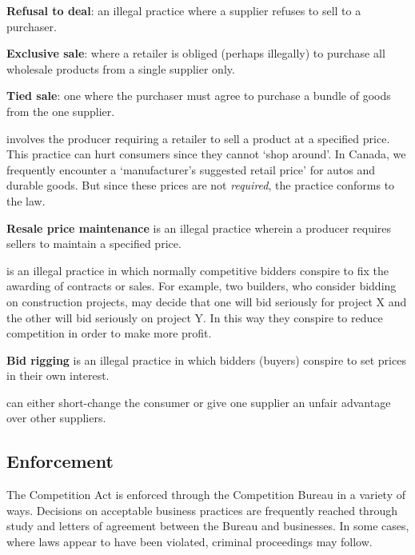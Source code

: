 \begin{DefBox}
\textbf{Refusal to deal}: an illegal practice where a supplier refuses to sell to a purchaser.

\textbf{Exclusive sale}: where a retailer is obliged (perhaps illegally) to purchase all wholesale products from a single supplier only.

\textbf{Tied sale}: one where the purchaser must agree to purchase a bundle of goods from the one supplier.
\end{DefBox}

 involves the producer requiring a retailer to sell a product at a specified price. This practice can hurt consumers since they cannot `shop around'.  In Canada, we frequently encounter a `manufacturer's suggested retail price' for autos and durable goods. But since these prices are not \textit{required}, the practice conforms to the law.

\begin{DefBox}
\textbf{Resale price maintenance} is an illegal practice wherein a producer requires sellers to maintain a specified price.
\end{DefBox}

 is an illegal practice in which normally competitive bidders conspire to fix the awarding of contracts or sales. For example, two builders, who consider bidding on construction projects, may decide that one will bid seriously for project X and the other will bid seriously on project Y.  In this way they conspire to reduce competition in order to make more profit.

\begin{DefBox}
\textbf{Bid rigging} is an illegal practice in which bidders (buyers) conspire to set prices in their own interest.
\end{DefBox}

 can either short-change the consumer or give one supplier an unfair advantage over other suppliers.

\subsection*{Enforcement}

The Competition Act is enforced through the Competition Bureau in a variety of ways. Decisions on acceptable business practices are frequently reached through study and letters of agreement between the Bureau and businesses. In some cases, where laws appear to have been violated, criminal proceedings may follow. 


